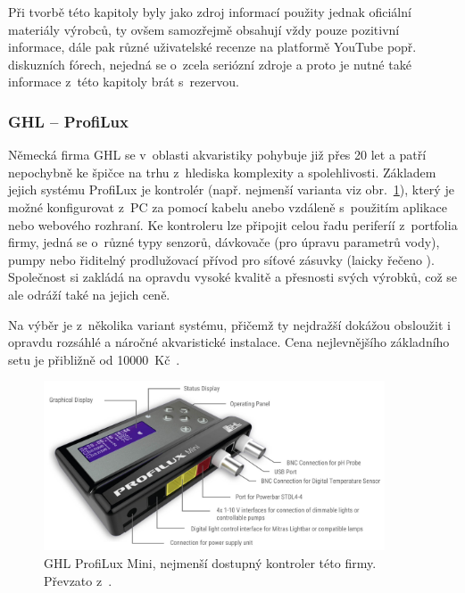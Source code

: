         Při tvorbě této kapitoly byly jako zdroj informací použity jednak oficiální materiály výrobců, ty ovšem samozřejmě obsahují vždy pouze pozitivní informace, dále pak různé uživatelské recenze na platformě YouTube popř. diskuzních fórech, nejedná se o~zcela seriózní zdroje a proto je nutné také informace z~této kapitoly brát s~rezervou. 

        \subsubsection{GHL -- ProfiLux}
            Německá firma GHL se v~oblasti akvaristiky pohybuje již přes 20 let a patří nepochybně ke špičce na trhu z~hlediska komplexity a spolehlivosti. Základem jejich systému ProfiLux je kontrolér (např. nejmenší varianta viz obr.~\ref{fig:obrazky-trh-GHL-ProfiLux-Mini-jpg}), který je možné konfigurovat z~PC za pomocí kabelu anebo vzdáleně s~použitím aplikace nebo webového rozhraní. Ke kontroleru lze připojit celou řadu periferíí z~portfolia firmy, jedná se o~různé typy senzorů, dávkovače (pro úpravu parametrů vody), pumpy nebo řiditelný prodlužovací přívod pro síťové zásuvky (laicky řečeno ). Společnost si zakládá na opravdu vysoké kvalitě a přesnosti svých výrobků, což se ale odráží také na jejich ceně. 

            Na výběr je z~několika variant systému, přičemž ty nejdražší dokážou obsloužit i opravdu rozsáhlé a náročné akvaristické instalace. Cena nejlevnějšího základního setu je přibližně od \qty{10000}{Kč}~\cite{ghl-profilux,eshop-ghl-profilux-sets}.

            \begin{figure}[h!]
                \centering
                \includegraphics[width=0.9\textwidth]{obrazky/trh/GHL-ProfiLux-Mini.jpg}
                \caption{GHL ProfiLux Mini, nejmenší dostupný kontroler této firmy. Převzato z~\cite{ghl-profilux}.}
                \label{fig:obrazky-trh-GHL-ProfiLux-Mini-jpg}
            \end{figure}
            
